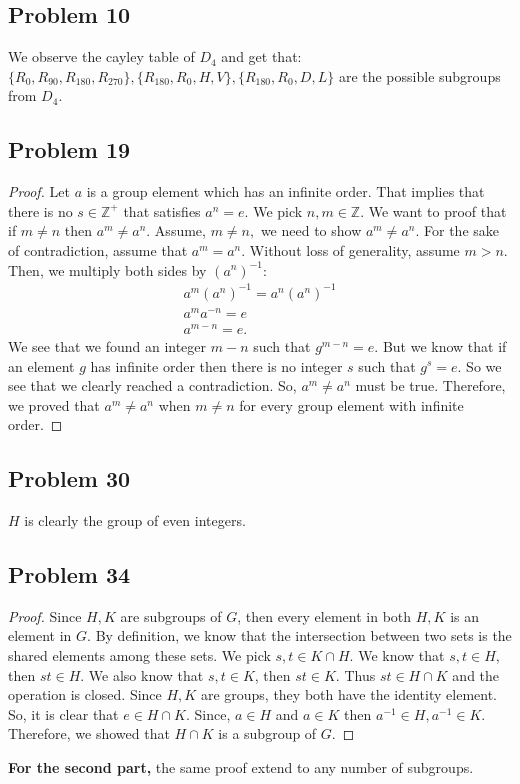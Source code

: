 \documentclass[a4paper,12pt]{article}
\begin{document}
\subsection*{Problem 10}
We observe the cayley table of $D_4$ and get that:\\
$\{R_{0},R_{90},R_{180},R_{270}\}, \{R_{180},R_{0},H,V\}, \{R_{180},R_{0},D,L\}$ are the possible subgroups from $D_4.$
\subsection*{Problem 19}
\begin{proof}
    Let $a$ is a group element which has an infinite order. That implies that there is no $s \in \mathbb{Z^+}$ that satisfies $a^n=e.$ We pick $n,m \in \mathbb{Z}.$ We want to proof that if $m \ne n$ then $a^m \ne a^n.$ Assume, $m \ne n,$ we need to show $a^m \ne a^n.$ For the sake of contradiction, assume that $a^m=a^n.$ Without loss of generality, assume $m>n.$ Then, we multiply both sides by $(a^n)^{-1}:$ 
    \begin{align*}
        a^m(a^n)^{-1}=a^n (a^n)^{-1}\\
        a^m a^{-n}=e\\
        a^{m-n}=e.
    \end{align*}
    We see that we found an integer $m-n$ such that $g^{m-n}=e.$ But we know that if an element $g$ has infinite order then there is no integer $s$ such that $g^s=e.$ So we see that we clearly reached a contradiction. So, $a^m \ne a^n$ must be true. Therefore, we proved that $a^m \ne a^n$ when $m \ne n$ for every group element with infinite order.
\end{proof}
\subsection*{Problem 30}
$H$ is clearly the group of even integers.
\subsection*{Problem 34}
\begin{proof}
    Since $H,K$ are subgroups of $G$, then every element in both $H,K$ is an element in $G.$ By definition, we know that the intersection between two sets is the shared elements among these sets. We pick $s,t \in K \cap H.$ We know that $s,t \in H$, then $st \in H$. We also know that $s,t \in K$, then $st \in K$. Thus $st \in H \cap K$ and the operation is closed. Since $H,K$ are groups, they both have the identity element. So, it is clear that $e \in H \cap K.$ Since, $a \in H$ and $a \in K$ then $a^{-1}\in H, a^{-1}\in K.$ Therefore, we showed that $H \cap K$ is a subgroup of $G.$
\end{proof}
\textbf{For the second part,} the same proof extend to any number of subgroups.
\end{document}
